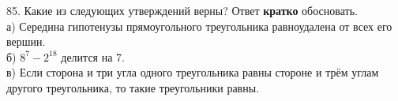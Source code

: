 85. Какие из следующих утверждений верны? Ответ {\bf кратко} обосновать.\\
а) Середина гипотенузы прямоугольного треугольника равноудалена от всех его вершин.\\
б) $8^7-2^{18}$ делится на 7.\\
в) Если сторона и три угла одного треугольника равны стороне и трём углам другого треугольника, то такие треугольники равны.\\
